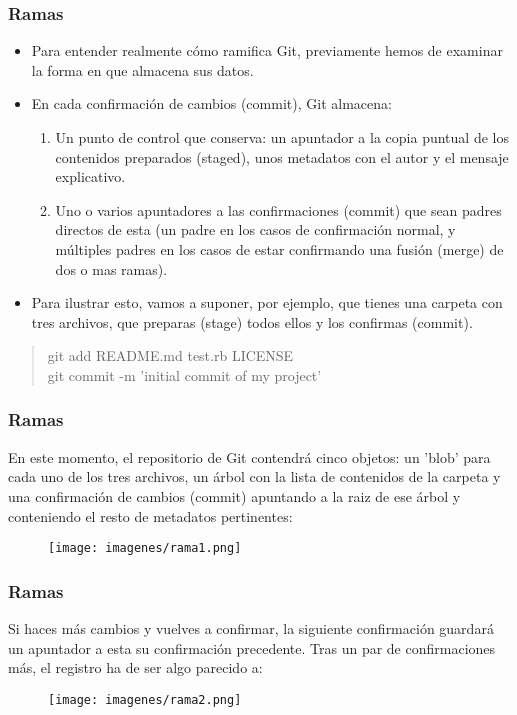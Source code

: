 \documentclass{beamer}
\begin{document}
\begin{frame}
\frametitle{Ramas}
\begin{itemize}[<+->]
\item Para entender realmente cómo ramifica Git, previamente hemos de examinar la forma en que almacena sus datos.
\item En cada confirmación de cambios (commit), Git almacena:
\begin{enumerate}
\item Un punto de control que conserva: un apuntador a la copia puntual de los contenidos preparados (staged), unos metadatos con el autor y el mensaje explicativo.
\item Uno o varios apuntadores a las confirmaciones (commit) que sean padres directos de esta (un padre en los casos de confirmación normal, y múltiples padres en los casos de estar confirmando una fusión (merge) de dos o mas ramas).
\end{enumerate} 
\item Para ilustrar esto, vamos a suponer, por ejemplo, que tienes una carpeta con tres archivos, que preparas (stage) todos ellos y los confirmas (commit). 
\end{itemize}
\pause
\begin{verse}
git add README.md test.rb LICENSE\\
git commit -m 'initial commit of my project'
\end{verse}
\end{frame}

\begin{frame}
\frametitle{Ramas}
En este momento, el repositorio de Git contendrá cinco objetos: un 'blob' para cada uno de los tres archivos, un árbol con la lista de contenidos de la carpeta y una confirmación de cambios (commit) apuntando a la raiz de ese árbol y conteniendo el resto de metadatos pertinentes:
\begin{figure}
\texttt{[image: imagenes/rama1.png]}
\end{figure}
\end{frame}

\begin{frame}
\frametitle{Ramas}
Si haces más cambios y vuelves a confirmar, la siguiente confirmación guardará un apuntador a esta su confirmación precedente. Tras un par de confirmaciones más, el registro ha de ser algo parecido a:
\begin{figure}
\texttt{[image: imagenes/rama2.png]}
\end{figure}
\end{frame}
\end{document}
